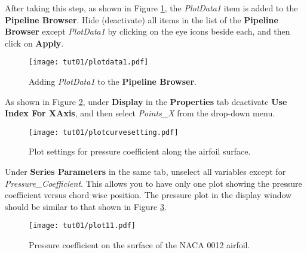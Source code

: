 After taking this step, as shown in Figure \ref{fig1:plotdata-list}, the \textit{PlotData1} item is added to the \textbf{Pipeline Browser}. Hide (deactivate) all items in the list of the \textbf{Pipeline Browser} except \textit{PlotData1} by clicking on the eye icons beside each, and then click on \textbf{Apply}.
\begin{figure}[htbp]
    \centering
    \texttt{[image: tut01/plotdata1.pdf]}
    \caption{Adding \textit{PlotData1} to the \textbf{Pipeline Browser}.}
    \label{fig1:plotdata-list}
\end{figure}
As shown in Figure \ref{fig1:pointsx}, under \textbf{Display} in the \textbf{Properties} tab deactivate \textbf{Use Index For XAxis}, and then select \textit{Points\_X} from the drop-down menu. 
\begin{figure}[htbp]
    \centering
    \texttt{[image: tut01/plotcurvesetting.pdf]}
    \caption{Plot settings for pressure coefficient along the airfoil surface.}
    \label{fig1:pointsx}
\end{figure}
Under \textbf{Series Parameters} in the same tab, unselect all variables except for \textit{Pressure\_Coefficient}. This allows you to have only one plot showing the pressure coefficient versus chord wise position. The pressure plot in the display window should be similar to that shown in Figure \ref{fig1:surface_pressure}.
\begin{figure}[htbp]
    \centering
    \texttt{[image: tut01/plot11.pdf]}
    \caption{Pressure coefficient on the surface of the NACA 0012 airfoil.}
    \label{fig1:surface_pressure}
\end{figure}

